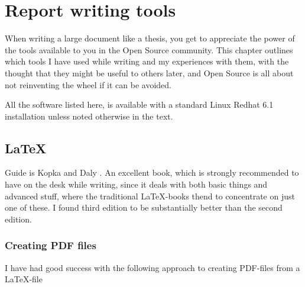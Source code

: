 
\chapter{Report writing tools}

When writing a large document like a thesis, you get to appreciate the
power of the tools available to you in the Open Source community.
This chapter outlines which tools I have used while writing and my
experiences with them, with the thought that they might be useful to
others later, and Open Source is all about not reinventing the wheel
if it can be avoided.  

All the software listed here, is available with a standard Linux
Redhat 6.1 installation unless noted otherwise in the text.


\section{\LaTeX}
\label{sec:report-writing-tools-latex}


Guide is Kopka and Daly \cite{a-guide-to-latex}.  An excellent book,
which is strongly recommended to have on the desk while writing, since
it deals with both basic things and advanced stuff, where the
traditional LaTeX-books thend to concentrate on just one of these.  I
found third edition to be substantially better than the second edition.


\subsection{Creating PDF files}
\label{sec:report-writing-creating-pdf-files}

I have had good success with the following approach to creating
PDF-files from a \LaTeX-file


